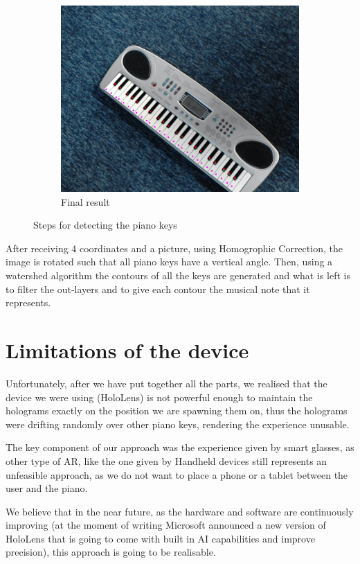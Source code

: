 \documentclass[12 pct]{report}
\begin{document}
\begin{figure}[H]
\begin{subfigure}[b]{0.7\linewidth}
    \includegraphics[width=\linewidth]{piano-pointsv2}
    \caption{Final result}
  \end{subfigure}
  \caption{Steps for detecting the piano keys}
  \label{fig:coffee3}
\end{figure}

After receiving 4 coordinates and a picture, using Homogrophic Correction, the image is rotated such that all piano keys have a vertical angle. Then, using a watershed algorithm the contours of all the keys are generated and what is left is to filter the out-layers and to give each contour the musical note that it represents. 

\section{Limitations of the device}

Unfortunately, after we have put together all the parts, we realised that the device we were using (HoloLens) is not powerful enough to maintain the holograms exactly on the position we are spawning them on, thus the holograms were drifting randomly over other piano keys, rendering the experience unusable.

The key component of our approach was the experience given by smart glasses, as other type of AR, like the one given by Handheld devices still represents an unfeasible approach, as we do not want to place a phone or a tablet between the user and the piano.

We believe that in the near future, as the hardware and software are continuously improving (at the moment of writing Microsoft announced a new version of HoloLens that is going to come with built in AI capabilities and improve precision), this approach is going to be realisable.
\end{document}
